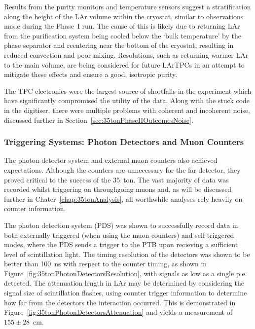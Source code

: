 Results from the purity monitors and temperature sensors suggest a stratification along the height of the LAr volume within the cryostat, similar to observations made during the Phase~I run.  The cause of this is likely due to returning LAr from the purification system being cooled below the `bulk temperature' by the phase separator and reentering near the bottom of the cryostat, resulting in reduced convection and poor mixing.  Resolutions, such as returning warmer LAr to the main volume, are being considered for future LArTPCs in an attempt to mitigate these effects and ensure a good, isotropic purity.

The TPC electronics were the largest source of shortfalls in the experiment which have significantly compromised the utility of the data.  Along with the stuck code in the digitiser, there were multiple problems with coherent and incoherent noise, discussed further in Section~\ref{sec:35tonPhaseIIOutcomesNoise}.

\subsubsection{Triggering Systems: Photon Detectors and Muon Counters}\label{sec:35tonPhaseIIOutcomesTriggeringSystems}

The photon detector system and external muon counters also achieved expectations.  Although the counters are unnecessary for the far detector, they proved critical to the success of the 35~ton.  The vast majority of data was recorded whilst triggering on throughgoing muons and, as will be discussed further in Chater~\ref{chap:35tonAnalysis}, all worthwhile analyses rely heavily on counter information.

The photon detection system (PDS) was shown to successfully record data in both externally triggered (when using the muon counters) and self-triggered modes, where the PDS sends a trigger to the PTB upon recieving a sufficient level of scintillation light.  The timing resolution of the detectors was shown to be better than 100~ns with respect to the counter timing, as shown in Figure~\ref{fig:35tonPhotonDetectorsResolution}, with signals as low as a single p.e. detected.  The attenuation length in LAr may be determined by considering the signal size of scintillation flashes, using counter trigger information to determine how far from the detectors the interaction occurred.  This is demonstrated in Figure~\ref{fig:35tonPhotonDetectorsAttenuation} and yields a measurement of $155\pm28$~cm.

